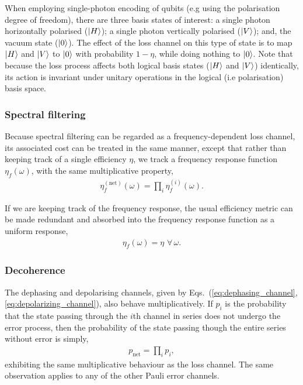 When employing single-photon encoding of qubits (e.g using the polarisation degree of freedom), there are three basis states of interest: a single photon horizontally polarised ($|H\rangle$); a single photon vertically polarised ($|V\rangle$); and, the vacuum state ($|0\rangle$). The effect of the loss channel on this type of state is to map $|H\rangle$ and $|V\rangle$ to $|\mathrm{0}\rangle$ with probability \mbox{$1-\eta$}, while doing nothing to $|\mathrm{0}\rangle$. Note that because the loss process affects both logical basis states ($|H\rangle$ and $|V\rangle$) identically, its action is invariant under unitary operations in the logical (i.e polarisation) basis space.

%
%

\subsubsection{Spectral filtering} 

Because spectral filtering can be regarded as a frequency-dependent loss channel, its associated cost can be treated in the same manner, except that rather than keeping track of a single efficiency $\eta$, we track a frequency response function $\eta_f(\omega)$, with the same multiplicative property,
\begin{align}
	\eta_f^\mathrm{(net)}(\omega)=\prod_i \eta_f^{(i)}(\omega).
\end{align}

If we are keeping track of the frequency response, the usual efficiency metric can be made redundant and absorbed into the frequency response function as a uniform response,
\begin{align}
	\eta_f(\omega)=\eta\,\,\forall\,\omega.
\end{align}

%
%

\subsubsection{Decoherence}   

The dephasing and depolarising channels, given by Eqs.~(\ref{eq:dephasing_channel},\ref{eq:depolarizing_channel}), also behave multiplicatively. If $p_i$ is the probability that the state passing through the $i$th channel in series does not undergo the error process, then the probability of the state passing though the entire series without error is simply,
\begin{align}
p_\mathrm{net}=\prod_i p_i,
\end{align}
exhibiting the same multiplicative behaviour as the loss channel. The same observation applies to any of the other Pauli error channels.

